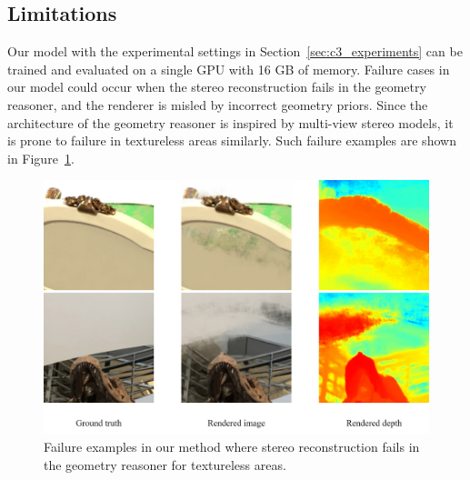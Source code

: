 \subsection{Limitations} \label{sec:c3_limitations}
Our model with the experimental settings in Section~\ref{sec:c3_experiments} can be trained and evaluated on a single GPU with 16 GB of memory. Failure cases in our model could occur when the stereo reconstruction fails in the geometry reasoner, and the renderer is misled by incorrect geometry priors. Since the architecture of the geometry reasoner is inspired by multi-view stereo models, it is prone to failure in textureless areas similarly. Such failure examples are shown in Figure~\ref{fig:c3_failure}.

\begin{figure}[!t]
	\begin{center}
		\includegraphics[width=1.0\linewidth]{images/chapter3/figures/failure.jpg}
	\end{center}
        \vspace{-2ex}
	\caption{Failure examples in our method where stereo reconstruction fails in the geometry reasoner for textureless areas.}
	\label{fig:c3_failure}
\end{figure}
